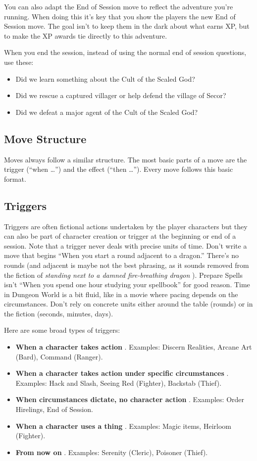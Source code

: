  You can also adapt the End of Session move to reflect the adventure you're running. When doing this it's key that you show the players the new End of Session move. The goal isn't to keep them in the dark about what earns XP, but to make the XP awards tie directly to this adventure.


 When you end the session, instead of using the normal end of session questions, use these:
\begin{itemize}
\item Did we learn something about the Cult of the Scaled God?
\item Did we rescue a captured villager or help defend the village of Secor?
\item Did we defeat a major agent of the Cult of the Scaled God?

\end{itemize}
\subsection{Move Structure}


 Moves always follow a similar structure. The most basic parts of a move are the trigger (``when \ldots '') and the effect (``then \ldots ''). Every move follows this basic format.
\subsection{Triggers}


 Triggers are often fictional actions undertaken by the player characters but they can also be part of character creation or trigger at the beginning or end of a session. Note that a trigger never deals with precise units of time. Don't write a move that begins ``When you start a round adjacent to a dragon.'' There's no rounds (and adjacent is maybe not the best phrasing, as it sounds removed from the fiction of \emph{standing next to a damned fire-breathing dragon}
). Prepare Spells isn't ``When you spend one hour studying your spellbook'' for good reason. Time in Dungeon World is a bit fluid, like in a movie where pacing depends on the circumstances. Don't rely on concrete units either around the table (rounds) or in the fiction (seconds, minutes, days).


 Here are some broad types of triggers:
\begin{itemize}
\item \textbf{When a character takes action}
. Examples: Discern Realities, Arcane Art (Bard), Command (Ranger).
\item \textbf{When a character takes action under specific circumstances}
. Examples: Hack and Slash, Seeing Red (Fighter), Backstab (Thief).
\item \textbf{When circumstances dictate, no character action}
. Examples: Order Hirelings, End of Session.
\item \textbf{When a character uses a thing}
. Examples: Magic items, Heirloom (Fighter).
\item \textbf{From now on}
. Examples: Serenity (Cleric), Poisoner (Thief).

\end{itemize}
